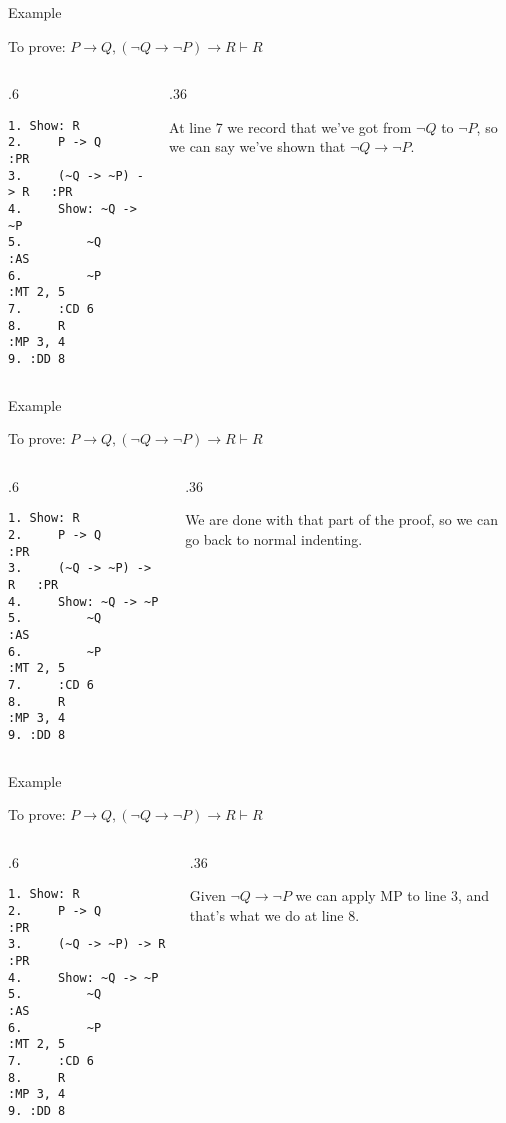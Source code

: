 \documentclass[
  ignorenonframetext,
]{beamer}
\renewcommand{\,}{\text{, }}
\def\begincols{\begin{columns}}
\def\begincol{\begin{column}}
\def\endcol{\end{column}}
\def\endcols{\end{columns}}
\begin{document}
\begin{frame}[fragile]{Example}
\protect\hypertarget{example-11}{}

To prove:
\(P \rightarrow Q, (\neg Q \rightarrow \neg P) \rightarrow R \vdash R\)

\bigskip

\begincols
\begincol{.6\textwidth}

\begin{verbatim}
1. Show: R
2.     P -> Q            :PR
3.     (~Q -> ~P) -> R   :PR
4.     Show: ~Q -> ~P
5.         ~Q            :AS
6.         ~P            :MT 2, 5
7.     :CD 6
8.     R                 :MP 3, 4
9. :DD 8
\end{verbatim}

\endcol
\begincol{.36\textwidth}

At line 7 we record that we've got from \(\neg Q\) to \(\neg P\), so we
can say we've shown that \(\neg Q \rightarrow \neg P\).

\endcol
\endcols

\end{frame}

\begin{frame}[fragile]{Example}
\protect\hypertarget{example-12}{}

To prove:
\(P \rightarrow Q, (\neg Q \rightarrow \neg P) \rightarrow R \vdash R\)

\bigskip

\begincols
\begincol{.6\textwidth}

\begin{verbatim}
1. Show: R
2.     P -> Q            :PR
3.     (~Q -> ~P) -> R   :PR
4.     Show: ~Q -> ~P
5.         ~Q            :AS
6.         ~P            :MT 2, 5
7.     :CD 6
8.     R                 :MP 3, 4
9. :DD 8
\end{verbatim}

\endcol
\begincol{.36\textwidth}

We are done with that part of the proof, so we can go back to normal
indenting.

\endcol
\endcols

\end{frame}

\begin{frame}[fragile]{Example}
\protect\hypertarget{example-13}{}

To prove:
\(P \rightarrow Q, (\neg Q \rightarrow \neg P) \rightarrow R \vdash R\)

\bigskip

\begincols
\begincol{.6\textwidth}

\begin{verbatim}
1. Show: R
2.     P -> Q            :PR
3.     (~Q -> ~P) -> R   :PR
4.     Show: ~Q -> ~P
5.         ~Q            :AS
6.         ~P            :MT 2, 5
7.     :CD 6
8.     R                 :MP 3, 4
9. :DD 8
\end{verbatim}

\endcol
\begincol{.36\textwidth}

Given \(\neg Q \rightarrow \neg P\) we can apply MP to line 3, and
that's what we do at line 8.

\endcol
\endcols

\end{frame}
\end{document}
